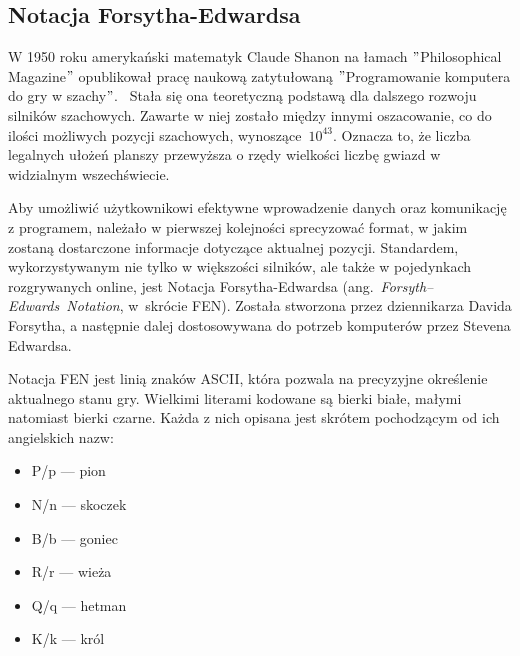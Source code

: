\subsection{Notacja Forsytha-Edwardsa}
\label{subsec:notacja-fen}


W 1950 roku amerykański matematyk Claude Shanon na łamach \("\)Philosophical Magazine\("\) opublikował pracę naukową zatytułowaną \("\)Programowanie komputera do gry w szachy\("\).~\cite*{Shannon1950XXIIPA}
Stała się ona teoretyczną podstawą dla dalszego rozwoju silników szachowych.
Zawarte w niej zostało między innymi oszacowanie, co do ilości możliwych pozycji szachowych, wynoszące~$10^{43}$.
Oznacza to, że liczba legalnych ułożeń planszy przewyższa o rzędy wielkości liczbę gwiazd w widzialnym wszechświecie.

Aby umożliwić użytkownikowi efektywne wprowadzenie danych oraz komunikację z programem, należało w pierwszej kolejności sprecyzować format, w jakim zostaną dostarczone informacje dotyczące aktualnej pozycji.
Standardem, wykorzystywanym nie tylko w większości silników, ale także w pojedynkach rozgrywanych online, jest Notacja Forsytha-Edwardsa (ang.~\emph{Forsyth–Edwards~Notation}, w~skrócie FEN).
Została stworzona przez dziennikarza Davida Forsytha, a następnie dalej dostosowywana do potrzeb komputerów przez Stevena Edwardsa.

Notacja FEN jest linią znaków ASCII, która pozwala na precyzyjne określenie aktualnego stanu gry.
Wielkimi literami kodowane są bierki białe, małymi natomiast bierki czarne.
Każda z nich opisana jest skrótem pochodzącym od ich angielskich nazw:

\begin{multicols}{3}
    \begin{itemize}
        \item P/p — pion
        \item N/n — skoczek
        \item B/b — goniec
        \item R/r — wieża
        \item Q/q — hetman
        \item K/k — król
    \end{itemize}
\end{multicols}


